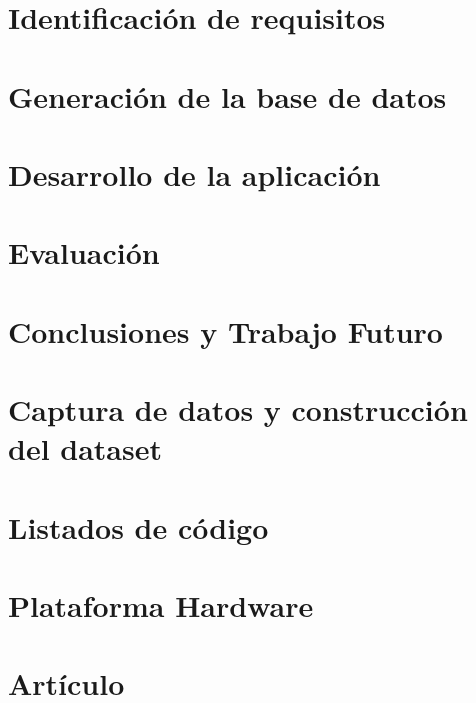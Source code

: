 \documentclass[11pt,a4paper,spanish]{book}
\begin{document}
\chapter{Identificación de requisitos}\label{chap:requisitos}


\chapter{Generación de la base de datos}\label{chap:generar:dataset}


\chapter{Desarrollo de la aplicación}\label{chap:desarrollo:algoritmo}
 


\chapter{Evaluación}\label{chap:eval}


\chapter{Conclusiones y Trabajo Futuro}\label{chap:conclusiones}



% 
% 
\newpage %



\lstlistoflistings

\appendix

\chapter{Captura de datos y construcción del dataset}\label{app:dataset}
% 

\chapter{Listados de código}\label{app:codigo}


\chapter{Plataforma Hardware}\label{app:plataforma}


\chapter{Artículo}

\listoftodos
\end{document}
